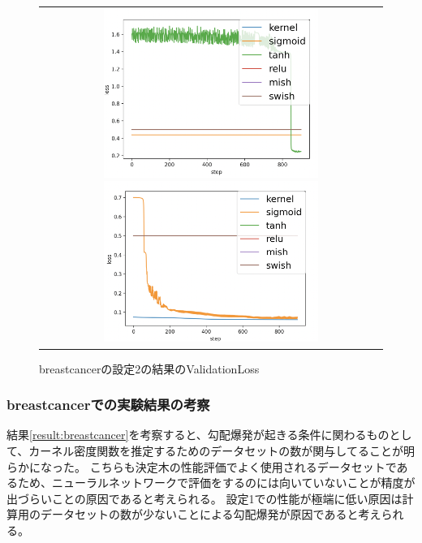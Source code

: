 \begin{figure}[hbtp]
    \begin{center}
        \begin{tabular}{c}
            \begin{minipage}{0.5\hsize}
                \includegraphics[clip, width=7cm]{asset/breastcancer_0.001_1000_3_005_sgd_non_kaiming_uniform}
                    \caption{breastcancerの設定1の結果のValidationLoss}
                    \label{breastcancer:loss_image1}
            \end{minipage}
            \hspace{10pt}
            \begin{minipage}{0.5\hsize}
                \includegraphics[clip, width=7cm]{asset/breastcancer_0.001_1000_3_05_sgd_non_kaiming_uniform}
                    \caption{breastcancerの設定2の結果のValidationLoss}
                    \label{breastcancer:loss_image2}
            \end{minipage}
        \end{tabular}
    \end{center}
\end{figure}


\subsubsection{breastcancerでの実験結果の考察}
結果\ref{result:breastcancer}を考察すると、勾配爆発が起きる条件に関わるものとして、カーネル密度関数を推定するためのデータセットの数が関与してることが明らかになった。
こちらも決定木の性能評価でよく使用されるデータセットであるため、ニューラルネットワークで評価をするのには向いていないことが精度が出づらいことの原因であると考えられる。
設定1での性能が極端に低い原因は計算用のデータセットの数が少ないことによる勾配爆発が原因であると考えられる。

